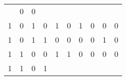\begin{tabular}{|c|c|c|c||c|c|c|c|c|c|}
    
    
    & 0
  
    
    
    & 0
   \\
  

  
  
  1 & 0 & 1 & 0
  
    
    
    & 1
  
    
    
    & 0
  
    
    
    & 1
  
    
    
    & 0
  
    
    
    & 0
  
    
    
    & 0
   \\
  

  
  
  1 & 0 & 1 & 1
  
    
    
    & 0
  
    
    
    & 0
  
    
    
    & 0
  
    
    
    & 0
  
    
    
    & 1
  
    
    
    & 0
   \\
  \hline

  
  
  1 & 1 & 0 & 0
  
    
    
    & 1
  
    
    
    & 1
  
    
    
    & 0
  
    
    
    & 0
  
    
    
    & 0
  
    
    
    & 0
   \\
  

  
  
  1 & 1 & 0 & 1
  

\end{tabular}
